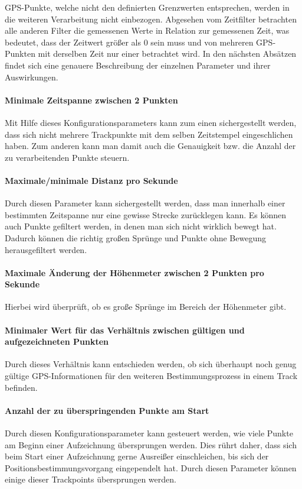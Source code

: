 GPS-Punkte, welche nicht den definierten Grenzwerten entsprechen, werden in die weiteren Verarbeitung nicht einbezogen. Abgesehen vom Zeitfilter betrachten alle anderen Filter die gemessenen Werte in Relation zur gemessenen Zeit, was bedeutet, dass der Zeitwert größer als 0 sein muss und von mehreren GPS-Punkten mit derselben Zeit nur einer betrachtet wird. In den nächsten Absätzen findet sich eine genauere Beschreibung der einzelnen Parameter und ihrer Auswirkungen.

\paragraph{Minimale Zeitspanne zwischen 2 Punkten} Mit Hilfe dieses Konfigurationsparameters kann zum einen sichergestellt werden, dass sich nicht mehrere Trackpunkte mit dem selben Zeitstempel eingeschlichen haben. Zum anderen kann man damit auch die Genauigkeit bzw. die Anzahl der zu verarbeitenden Punkte steuern.

\paragraph{Maximale/minimale Distanz pro Sekunde} Durch diesen Parameter kann sichergestellt werden, dass man innerhalb einer bestimmten Zeitspanne nur eine gewisse Strecke zurücklegen kann. Es können auch Punkte gefiltert werden,  in denen man sich nicht wirklich bewegt hat. Dadurch können die richtig großen Sprünge und Punkte ohne Bewegung herausgefiltert werden.

\paragraph{Maximale Änderung der Höhenmeter zwischen 2 Punkten pro Sekunde} Hierbei wird überprüft, ob es große Sprünge im Bereich der Höhenmeter gibt. 

\paragraph{Minimaler Wert für das Verhältnis zwischen gültigen und aufgezeichneten Punkten} Durch dieses Verhältnis kann entschieden werden, ob sich überhaupt noch genug gültige GPS-Informationen für den weiteren Bestimmungsprozess in einem Track befinden.

\paragraph{Anzahl der zu überspringenden Punkte am Start} Durch diesen Konfigurationsparameter kann gesteuert werden, wie viele Punkte am Beginn einer Aufzeichnung übersprungen werden. Dies rührt daher, dass sich beim Start einer Aufzeichnung gerne Ausreißer einschleichen, bis sich der Positionsbestimmungsvorgang eingependelt hat. Durch diesen Parameter können einige dieser Trackpoints übersprungen werden.

